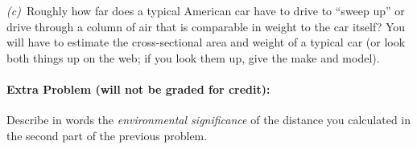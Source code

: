 \documentclass[12pt]{article}
\begin{document}
\textsl{(c)}~Roughly how far does a typical American car have to drive
to ``sweep up'' or drive through a column of air that is comparable in
weight to the car itself?  You will have to estimate the
cross-sectional area and weight of a typical car (or look both things
up on the web; if you look them up, give the make and model).

\paragraph{Extra Problem (will not be graded for credit):}%
Describe in words the \emph{environmental significance} of the
distance you calculated in the second part of the previous problem.
\end{document}
